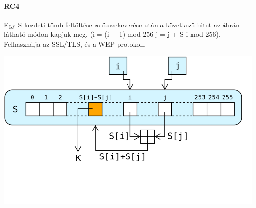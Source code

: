 \paragraph{RC4}
\begin{multicols}{2}
Egy S kezdeti tömb feltöltése és összekeverése után a következő bitet az  %
ábrán látható módon kapjuk meg, (i = (i + 1) mod 256 j = j + S i mod 256).
Felhasználja az SSL/TLS, és a WEP protokoll.
\begin{center}
	\includegraphics[width=\linewidth]{fig/14-RC4}
\end{center}
\end{multicols}

